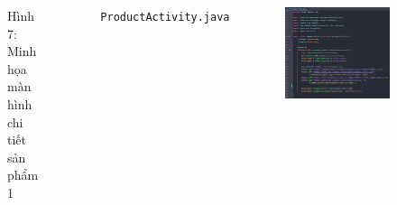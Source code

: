 \documentclass{beamer}
\begin{document}
\begin{frame}
\begin{columns}
\begin{figure}
            \caption{\centering\tiny{Hình 7: Minh họa màn hình chi tiết sản phẩm 1}}
        \end{figure}
        \indent \texttt{ProductActivity.java}
        \begin{figure}
            \centering
            \includegraphics[width=\textwidth]{images/39.png}
        \end{figure}
    \end{columns}
\end{frame}
\end{document}
